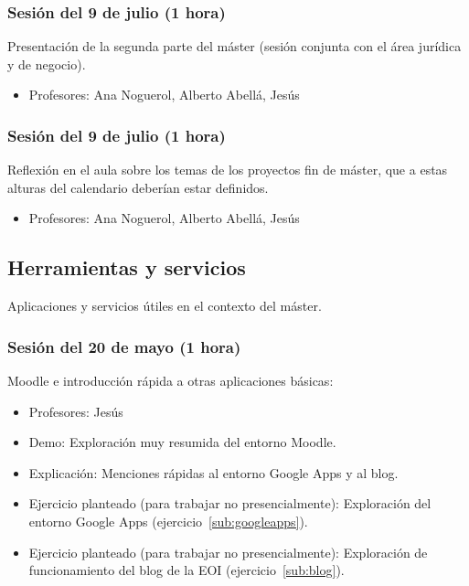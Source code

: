 \documentclass[a4paper,12pt]{article}
\begin{document}
\subsubsection{Sesión del 9 de julio (1 hora)}

Presentación de la segunda parte del máster (sesión conjunta con el área jurídica y de negocio).

\begin{itemize}
\item Profesores: Ana Noguerol, Alberto Abellá, Jesús
\end{itemize}

\subsubsection{Sesión del 9 de julio (1 hora)}

Reflexión en el aula sobre los temas de los proyectos fin de máster, que a estas alturas del calendario deberían estar definidos.

\begin{itemize}
\item Profesores: Ana Noguerol, Alberto Abellá, Jesús
\end{itemize}


\subsection{Herramientas y servicios}

Aplicaciones y servicios útiles en el contexto del máster.

\subsubsection{Sesión del 20 de mayo (1 hora)}

Moodle e introducción rápida a otras aplicaciones básicas:

\begin{itemize}
\item Profesores: Jesús
\item Demo: Exploración muy resumida del entorno Moodle.
\item Explicación: Menciones rápidas al entorno Google Apps y al blog.
\item Ejercicio planteado (para trabajar no presencialmente): Exploración del entorno Google Apps (ejercicio~\ref{sub:googleapps}).
\item Ejercicio planteado (para trabajar no presencialmente): Exploración de funcionamiento del blog de la EOI (ejercicio~\ref{sub:blog}).
\end{itemize}
\end{document}
